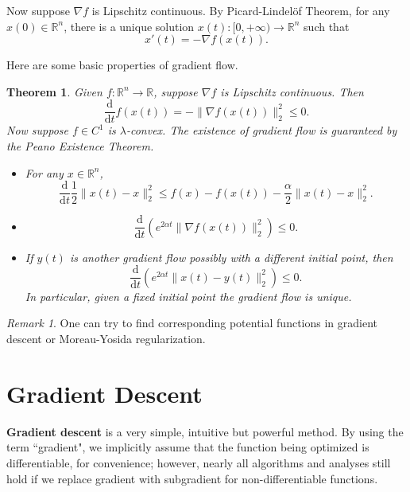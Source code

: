 \documentclass[openany]{book}
\newtheorem{theorem}{Theorem}[chapter]
\theoremstyle{definition}
\theoremstyle{remark}
\newtheorem*{remark}{Remark}
\begin{document}
Now suppose $\nabla f$ is Lipschitz continuous. By Picard-Lindel\"{o}f Theorem, for any $x(0)\in \mathbb{R}^n$, there is a unique solution $x(t):[0,+\infty)\to \mathbb{R}^n$ such that
\begin{equation*}
    x'(t)=-\nabla f(x(t)).
\end{equation*}

Here are some basic properties of gradient flow.
\begin{theorem}
    Given $f:\mathbb{R}^n\to \mathbb{R}$, suppose $\nabla f$ is Lipschitz continuous. Then
    \begin{equation*}
        \frac{\mathrm{d}}{\mathrm{d}t}f(x(t))=-\|\nabla f(x(t))\|_2^2\le0.
    \end{equation*}
    Now suppose $f\in C^1$ is $\lambda$-convex. The existence of gradient flow is guaranteed by the Peano Existence Theorem.
    \begin{itemize}
        \item For any $x\in \mathbb{R}^n$,
        \begin{equation*}
            \frac{\mathrm{d}}{\mathrm{d}t}\frac{1}{2}\|x(t)-x\|_2^2\le f(x)-f(x(t))-\frac{\alpha}{2}\|x(t)-x\|_2^2.
        \end{equation*}

        \item
        \begin{equation*}
            \frac{\mathrm{d}}{\mathrm{d}t}\left(e^{2\alpha t}\|\nabla f(x(t))\|_2^2\right)\le0.
        \end{equation*}

        \item If $y(t)$ is another gradient flow possibly with a different initial point, then
        \begin{equation*}
            \frac{\mathrm{d}}{\mathrm{d}t}\left(e^{2\alpha t}\|x(t)-y(t)\|_2^2\right)\le0.
        \end{equation*}
        In particular, given a fixed initial point the gradient flow is unique.
    \end{itemize}
\end{theorem}
\begin{remark}
    One can try to find corresponding potential functions in gradient descent or Moreau-Yosida regularization.
\end{remark}

\chapter{Gradient Descent}
\textbf{Gradient descent} is a very simple, intuitive but powerful method. By using the term ``gradient", we implicitly assume that the function being optimized is differentiable, for convenience; however, nearly all algorithms and analyses still hold if we replace gradient with subgradient for non-differentiable functions.
\end{document}
